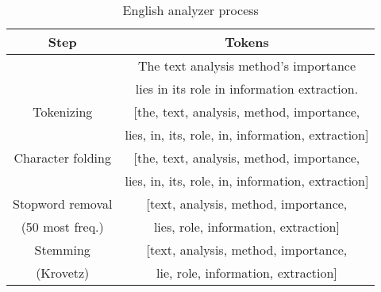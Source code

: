 \begin{table}[b]
    \caption{English analyzer process}
    \label{tab:english-analyzer}
    \centering
    \begin{tabular}{|c|c|}
        \toprule
        \textbf{Step} & \textbf{Tokens}\\
        \midrule
        & The text analysis method's importance\\
        & lies in its role in information extraction.\\ 
        \midrule
        Tokenizing & [the, text, analysis, method, importance,\\
        & lies, in, its, role, in, information, extraction]\\
        \midrule
        Character folding & [the, text, analysis, method, importance,\\
        & lies, in, its, role, in, information, extraction]\\
        \midrule
        Stopword removal & [text, analysis, method, importance,\\
        (50 most freq.) & lies, role, information, extraction]\\
        \midrule
        Stemming & [text, analysis, method, importance,\\
        (Krovetz) & lie, role, information, extraction]\\
        \bottomrule
    \end{tabular}
\end{table}